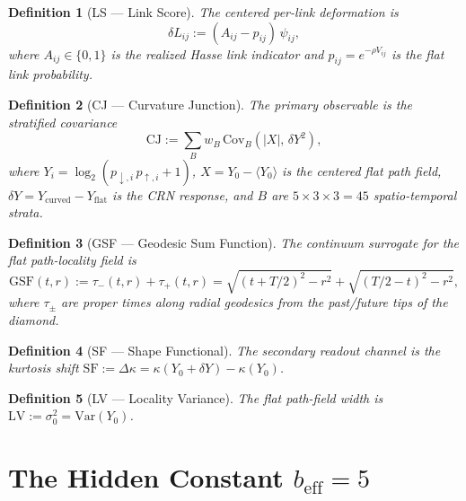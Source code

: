 \documentclass[12pt,a4paper]{article}
\newtheorem{definition}{Definition}
\begin{document}
\begin{definition}[LS --- Link Score]
The centered per-link deformation is
\begin{equation}
  \delta L_{ij} := (A_{ij} - p_{ij})\,\psi_{ij},
\end{equation}
where $A_{ij} \in \{0,1\}$ is the realized Hasse link indicator and $p_{ij} = e^{-\rho V_{ij}}$ is the flat link probability.
\end{definition}

\begin{definition}[CJ --- Curvature Junction]
The primary observable is the stratified covariance
\begin{equation}
  \mathrm{CJ} := \sum_B w_B\,\mathrm{Cov}_B\!\left(|X|,\,\delta Y^2\right),
\end{equation}
where $Y_i = \log_2(p_{\downarrow,i}\,p_{\uparrow,i} + 1)$, $X = Y_0 - \langle Y_0\rangle$ is the centered flat path field, $\delta Y = Y_{\mathrm{curved}} - Y_{\mathrm{flat}}$ is the CRN response, and $B$ are $5\!\times\!3\!\times\!3 = 45$ spatio-temporal strata.
\end{definition}

\begin{definition}[GSF --- Geodesic Sum Function]
The continuum surrogate for the flat path-locality field is
\begin{equation}
  \mathrm{GSF}(t,r) := \tau_-(t,r) + \tau_+(t,r)
  = \sqrt{(t + T/2)^2 - r^2} + \sqrt{(T/2 - t)^2 - r^2},
\end{equation}
where $\tau_\pm$ are proper times along radial geodesics from the past/future tips of the diamond.
\end{definition}

\begin{definition}[SF --- Shape Functional]
The secondary readout channel is the kurtosis shift $\mathrm{SF} := \Delta\kappa = \kappa(Y_0 + \delta Y) - \kappa(Y_0)$.
\end{definition}

\begin{definition}[LV --- Locality Variance]
The flat path-field width is $\mathrm{LV} := \sigma_0^2 = \mathrm{Var}(Y_0)$.
\end{definition}

\section{The Hidden Constant $b_{\mathrm{eff}} = 5$}
\end{document}
